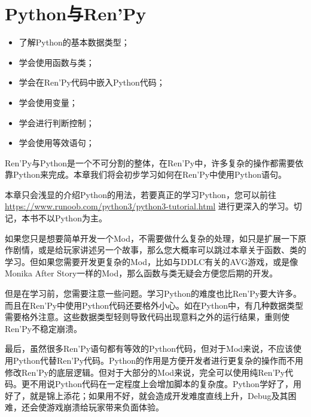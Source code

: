 \chapter{Python与Ren'Py}
\begin{ChapterGoals}
    \begin{itemize}
        \item 了解Python的基本数据类型；
        \item 学会使用函数与类；
        \item 学会在Ren'Py代码中嵌入Python代码；
        \item 学会使用变量；
        \item 学会进行判断控制；
        \item 学会使用等效语句；
    \end{itemize}
\end{ChapterGoals}

Ren'Py与Python是一个不可分割的整体，在Ren'Py中，许多复杂的操作都需要依靠Python来完成。本章我们将会初步学习如何在Ren'Py中使用Python语句。

\begin{Attention}
    本章只会浅显的介绍Python的用法，若要真正的学习Python，您可以前往 \url{https://www.runoob.com/python3/python3-tutorial.html} 进行更深入的学习。切记，本书不以Python为主。
\end{Attention}

\begin{Warning}
    如果您只是想要简单开发一个Mod，不需要做什么复杂的处理，如只是扩展一下原作剧情，或是给玩家讲述另一个故事，那么您大概率可以跳过本章关于函数、类的学习。但如果您需要开发更复杂的Mod，比如与DDLC有关的AVG游戏，或是像Monika After Story一样的Mod，那么函数与类无疑会方便您后期的开发。

    但是在学习前，您需要注意一些问题。学习Python的难度也比Ren'Py要大许多。而且在Ren'Py中使用Python代码还要格外小心。如在Python中，有几种数据类型需要格外注意。这些数据类型轻则导致代码出现意料之外的运行结果，重则使Ren'Py不稳定崩溃。

    最后，虽然很多Ren'Py语句都有等效的Python代码，但对于Mod来说，不应该使用Python代替Ren'Py代码。Python的作用是方便开发者进行更复杂的操作而不用修改Ren'Py的底层逻辑。但对于大部分的Mod来说，完全可以使用纯Ren'Py代码。更不用说Python代码在一定程度上会增加脚本的复杂度。Python学好了，用好了，就是锦上添花；如果用不好，就会造成开发难度直线上升，Debug及其困难，还会使游戏崩溃给玩家带来负面体验。
\end{Warning}






